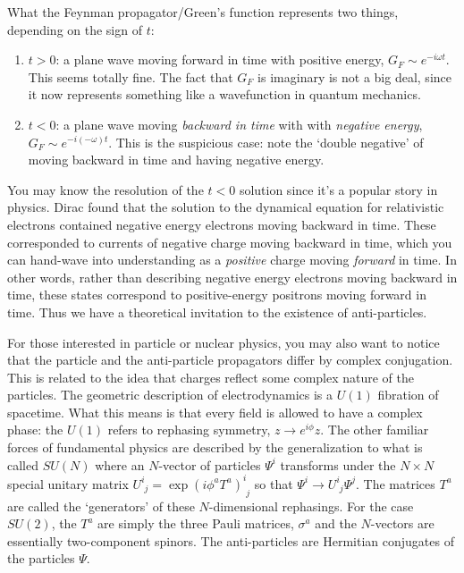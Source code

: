 \documentclass[
  11pt,
	colorful,
	raggedright,
]{tufte-style-thesis-flip}
\begin{document}
What the Feynman propagator/Green's function represents two things, depending on the sign of $t$:
\begin{enumerate}
\item $t>0$: a plane wave moving forward in time with positive energy, $G_F \sim e^{-i\omega t}$. This seems totally fine. The fact that $G_F$ is imaginary is not a big deal, since it now represents something like a wavefunction in quantum mechanics. 
\item $t<0$: a plane wave moving \emph{backward in time} with  with \emph{negative energy}, $G_F \sim e^{-i(-\omega) t}$. This is the suspicious case: note the `double negative' of moving backward in time and having negative energy.
\end{enumerate}
You may know the resolution of the $t<0$ solution since it's a popular story in physics. Dirac found that the solution to the dynamical equation for relativistic electrons contained negative energy electrons moving backward in time. These corresponded to currents of negative charge moving backward in time, which you can hand-wave into understanding as a \emph{positive} charge moving \emph{forward} in time. In other words, rather than describing negative energy electrons moving backward in time, these states correspond to positive-energy positrons moving forward in time. Thus we have a theoretical invitation to the existence of anti-particles.

\begin{framed}
For those interested in particle or nuclear physics, you may also want to notice that the particle and the anti-particle propagators differ by complex conjugation. This is related to the idea that charges reflect some complex nature of the particles. The geometric description of electrodynamics is a $U(1)$ fibration of spacetime. What this means is that every field is allowed to have a complex phase: the $U(1)$ refers to rephasing symmetry, $z\to e^{i\phi} z$. The other familiar forces of fundamental physics are described by the generalization to what is called $SU(N)$ where an $N$-vector of particles $\Psi^i$ transforms under the $N\times N$ special unitary matrix $U^i_{\phantom i j}=\exp(i\phi^a T^a)^i_{\phantom i j}$ so that $\Psi^i \to U^i_{\phantom i j} \Psi^j$. The matrices $T^a$ are called the `generators' of these $N$-dimensional rephasings. For the case $SU(2)$, the $T^a$ are simply the three Pauli matrices, $\sigma^a$ and the $N$-vectors are essentially two-component spinors. The anti-particles are Hermitian conjugates of the particles $\Psi$.
\end{framed}
\end{document}
